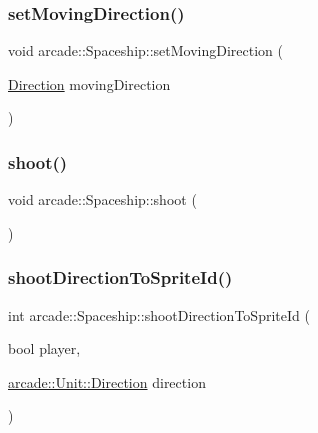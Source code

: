 \mbox{\label{classarcade_1_1_spaceship_aac1226902cf4345e7dc5b91dd6fdf1a4}} 
\subsubsection{\texorpdfstring{set\+Moving\+Direction()}{setMovingDirection()}}
{\footnotesize\ttfamily void arcade\+::\+Spaceship\+::set\+Moving\+Direction (\begin{DoxyParamCaption}\item[{\hyperlink{classarcade_1_1_unit_af418afeaba1f7fd5934b6ae1343215dd}{Direction}}]{moving\+Direction }\end{DoxyParamCaption})}

\mbox{\label{classarcade_1_1_spaceship_a3cac44ed8029c675de7df8dbbff545b4}} 
\subsubsection{\texorpdfstring{shoot()}{shoot()}}
{\footnotesize\ttfamily void arcade\+::\+Spaceship\+::shoot (\begin{DoxyParamCaption}{ }\end{DoxyParamCaption})\hspace{0.3cm}{\ttfamily [virtual]}}

\mbox{\label{classarcade_1_1_spaceship_a7c78ae50bdcb260920a96fb3eb703449}} 
\subsubsection{\texorpdfstring{shoot\+Direction\+To\+Sprite\+Id()}{shootDirectionToSpriteId()}}
{\footnotesize\ttfamily int arcade\+::\+Spaceship\+::shoot\+Direction\+To\+Sprite\+Id (\begin{DoxyParamCaption}\item[{bool}]{player,  }\item[{\hyperlink{classarcade_1_1_unit_af418afeaba1f7fd5934b6ae1343215dd}{arcade\+::\+Unit\+::\+Direction}}]{direction }\end{DoxyParamCaption})}

